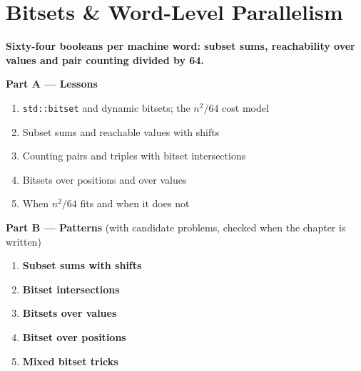 \chapter{Bitsets \& Word-Level Parallelism}
\label{ch:bitset}

\begin{tcolorbox}[enhanced, colback=white, colframe=secondaryblue, boxrule=1pt, arc=2mm]
\textbf{\large\textcolor{primaryblue}{Sixty-four booleans per machine word: subset sums, reachability over values and pair counting divided by 64.}}
\end{tcolorbox}


\begin{plannedbox}
\textbf{Part A --- Lessons}
\begin{enumerate}[leftmargin=*, label=\textbf{A\arabic*.}, itemsep=1pt]
    \item \texttt{std::bitset} and dynamic bitsets; the $n^2/64$ cost model
    \item Subset sums and reachable values with shifts
    \item Counting pairs and triples with bitset intersections
    \item Bitsets over positions and over values
    \item When $n^2/64$ fits and when it does not
\end{enumerate}
\textbf{Part B --- Patterns} (with candidate problems, checked when the chapter is written)
\begin{enumerate}[leftmargin=*, label=\textbf{P\arabic*.}, itemsep=1pt]
    \item \textbf{Subset sums with shifts}
    \item \textbf{Bitset intersections}
    \item \textbf{Bitsets over values}
    \item \textbf{Bitset over positions}
    \item \textbf{Mixed bitset tricks}
\end{enumerate}
\end{plannedbox}
